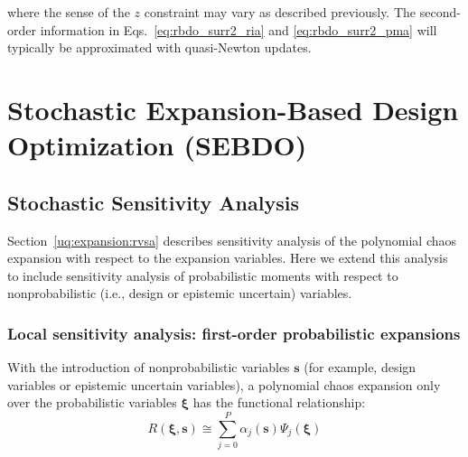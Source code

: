 where the sense of the $z$ constraint may vary as described
previously.  The second-order information in
Eqs.~\ref{eq:rbdo_surr2_ria} and \ref{eq:rbdo_surr2_pma} will
typically be approximated with quasi-Newton updates.


\section{Stochastic Expansion-Based Design Optimization (SEBDO)} \label{ouu:sebdo}


\subsection{Stochastic Sensitivity Analysis} \label{ouu:sebdo:ssa}

Section~\ref{uq:expansion:rvsa} describes sensitivity analysis of the
polynomial chaos expansion with respect to the expansion variables.
Here we extend this analysis to include sensitivity analysis of
probabilistic moments with respect to nonprobabilistic (i.e., design
or epistemic uncertain) variables.

\subsubsection{Local sensitivity analysis: first-order probabilistic expansions} \label{ouu:sebdo:ssa:dvsa_rve}

With the introduction of nonprobabilistic variables $\boldsymbol{s}$
(for example, design variables or epistemic uncertain variables), a
polynomial chaos expansion only over the probabilistic variables
$\boldsymbol{\xi}$ has the functional relationship:
\begin{equation}
R(\boldsymbol{\xi}, \boldsymbol{s}) \cong \sum_{j=0}^P \alpha_j(\boldsymbol{s}) 
\Psi_j(\boldsymbol{\xi}) \label{eq:R_alpha_s_psi_xi}
\end{equation}

